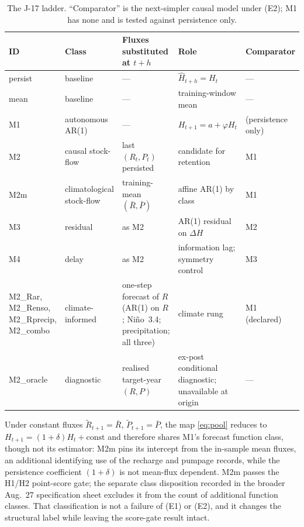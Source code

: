 \begin{table}[!htb]
\centering\small
\caption{The J-17 ladder. ``Comparator'' is the next-simpler causal model under (E2); M1 has none and is tested against persistence only.}
\label{tab:edwladder}
\begin{tabularx}{\textwidth}{@{}>{\raggedright\arraybackslash}p{}>{\raggedright\arraybackslash}p{}>{\raggedright\arraybackslash}p{}L>{\raggedright\arraybackslash}p{0.14\textwidth}@{}}
\toprule
ID & Class & Fluxes substituted at $t+h$ & Role & Comparator \\
\midrule
persist & baseline & --- & $\hat H_{t+h}=H_t$ & --- \\
mean & baseline & --- & training-window mean & --- \\
M1 & autonomous AR(1) & --- & $H_{t+1}=a+\varphi H_t$ & (persistence only) \\
M2 & causal stock-flow & last $(R_t,P_t)$ persisted & candidate for retention & M1 \\
M2m & climatological stock-flow & training-mean $(\bar R,\bar P)$ & affine AR(1) by class & M1 \\
M3 & residual & as M2 & AR(1) residual on $\Delta H$ & M2 \\
M4 & delay & as M2 & information lag; symmetry control & M3 \\
M2\_Rar, M2\_Renso, M2\_Rprecip, M2\_combo & climate-informed & one-step forecast of $R$ (AR(1) on $R$; Ni\~no~3.4; precipitation; all three) & climate rung & M1 (declared) \\
M2\_oracle & diagnostic & realised target-year $(R,P)$ & ex-post conditional diagnostic; unavailable at origin & --- \\
\bottomrule
\end{tabularx}
\end{table}

\begin{remark}\label{rem:class}
Under constant fluxes $\tilde R_{t+1}=\bar R$, $\tilde P_{t+1}=\bar P$, the map \eqref{eq:pool} reduces to $H_{t+1}=(1+\delta)H_t+\mathrm{const}$ and therefore shares M1's forecast function class, though not its estimator: M2m pins its intercept from the in-sample mean fluxes, an additional identifying use of the recharge and pumpage records, while the persistence coefficient $(1+\delta)$ is not mean-flux dependent. M2m passes the H1/H2 point-score gate; the separate class disposition recorded in the broader Aug.\ 27 specification sheet excludes it from the count of additional function classes. That classification is not a failure of (E1) or (E2), and it changes the structural label while leaving the score-gate result intact.
\end{remark}

